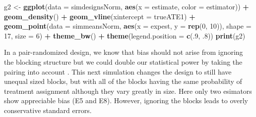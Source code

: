 \documentclass[
  12pt,
]{book}
\newenvironment{Shaded}{\begin{snugshade}}{\end{snugshade}}
\newcommand{\DataTypeTok}[1]{\textcolor[rgb]{0.13,0.29,0.53}{#1}}
\newcommand{\DecValTok}[1]{\textcolor[rgb]{0.00,0.00,0.81}{#1}}
\newcommand{\FloatTok}[1]{\textcolor[rgb]{0.00,0.00,0.81}{#1}}
\newcommand{\KeywordTok}[1]{\textcolor[rgb]{0.13,0.29,0.53}{\textbf{#1}}}
\newcommand{\NormalTok}[1]{#1}
\newcommand{\OperatorTok}[1]{\textcolor[rgb]{0.81,0.36,0.00}{\textbf{#1}}}
\newcommand{\StringTok}[1]{\textcolor[rgb]{0.31,0.60,0.02}{#1}}
\theoremstyle{definition}
\theoremstyle{definition}
\theoremstyle{definition}
\theoremstyle{remark}
\begin{document}
\begin{Shaded}
\begin{Highlighting}[]
\NormalTok{g2 <-}\StringTok{ }\KeywordTok{ggplot}\NormalTok{(}\DataTypeTok{data =}\NormalTok{ simdesignsNorm, }\KeywordTok{aes}\NormalTok{(}\DataTypeTok{x =}\NormalTok{ estimate, }\DataTypeTok{color =}\NormalTok{ estimator)) }\OperatorTok{+}
\StringTok{  }\KeywordTok{geom_density}\NormalTok{() }\OperatorTok{+}
\StringTok{  }\KeywordTok{geom_vline}\NormalTok{(}\DataTypeTok{xintercept =}\NormalTok{ trueATE1) }\OperatorTok{+}
\StringTok{  }\KeywordTok{geom_point}\NormalTok{(}\DataTypeTok{data =}\NormalTok{ simmeansNorm, }\KeywordTok{aes}\NormalTok{(}\DataTypeTok{x =}\NormalTok{ expest, }\DataTypeTok{y =} \KeywordTok{rep}\NormalTok{(}\DecValTok{0}\NormalTok{, }\DecValTok{10}\NormalTok{)), }\DataTypeTok{shape =} \DecValTok{17}\NormalTok{, }\DataTypeTok{size =} \DecValTok{6}\NormalTok{) }\OperatorTok{+}
\StringTok{  }\KeywordTok{theme_bw}\NormalTok{() }\OperatorTok{+}
\StringTok{  }\KeywordTok{theme}\NormalTok{(}\DataTypeTok{legend.position =} \KeywordTok{c}\NormalTok{(.}\DecValTok{9}\NormalTok{, }\FloatTok{.8}\NormalTok{))}
\KeywordTok{print}\NormalTok{(g2)}
\end{Highlighting}
\end{Shaded}

In a pair-randomized design, we know that bias should not arise from
ignoring the blocking structure but we could double our statistical
power by taking the pairing into account \citep{bowers2011mem}. This
next simulation changes the design to still have unequal sized blocks,
but with all of the blocks having the same probability of treatment
assignment although they vary greatly in size. Here only two esimators
show appreciable bias (E5 and E8). However, ignoring the blocks leads to
overly conservative standard errors.
\end{document}

